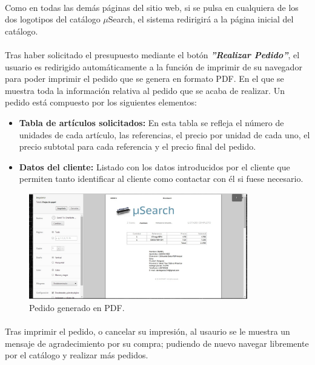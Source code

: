 \paragraph{}Como en todas las demás páginas del sitio web, si se pulsa en cualquiera de los dos logotipos del catálogo $\mu$Search, el sistema redirigirá a la página inicial del catálogo.

\paragraph{}Tras haber solicitado el presupuesto mediante el botón \textit{\textbf{''Realizar Pedido''}}, el usuario es redirigido automáticamente a la función de imprimir de su navegador para poder imprimir el pedido que se genera en formato PDF. En el que se muestra toda la información relativa al pedido que se acaba de realizar. Un pedido está compuesto por los siguientes elementos:

\begin{itemize}
	\item \textbf{Tabla de artículos solicitados:} En esta tabla se refleja el número de unidades de cada artículo, las referencias, el precio por unidad de cada uno, el precio subtotal para cada referencia y el precio final del pedido.
	
	\item \textbf{Datos del cliente:} Listado con los datos introducidos por el cliente que permiten tanto identificar al cliente como contactar con él si fuese necesario.
\end{itemize}

\begin{figure}[h!]
	\centering
	\includegraphics[width=0.85\textwidth]{img/pedido}
	\caption{Pedido generado en PDF.}
	\label{fig:pedido}
\end{figure}

\paragraph{} Tras imprimir el pedido, o cancelar su impresión, al usaurio se le muestra un mensaje de agradecimiento por su compra; pudiendo de nuevo navegar libremente por el catálogo y realizar más pedidos.